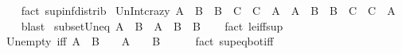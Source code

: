 \begin{isabellebody}
%
\isadelimproof
\ \ %
\endisadelimproof
%
\isatagproof
{}\isamarkupfalse%
\ {\isacharparenleft}{\kern0pt}fact\ sup{\isacharunderscore}{\kern0pt}inf{\isacharunderscore}{\kern0pt}distrib{}{\isacharparenright}{\kern0pt}%
\endisatagproof
{\isafoldproof}%
%
\isadelimproof
\isanewline
%
\endisadelimproof
\isanewline
{}\isamarkupfalse%
\ Un{\isacharunderscore}{\kern0pt}Int{\isacharunderscore}{\kern0pt}crazy{\isacharcolon}{\kern0pt}\ {\isachardoublequoteopen}{\isacharparenleft}{\kern0pt}A\ {\isasyminter}\ B{\isacharparenright}{\kern0pt}\ {\isasymunion}\ {\isacharparenleft}{\kern0pt}B\ {\isasyminter}\ C{\isacharparenright}{\kern0pt}\ {\isasymunion}\ {\isacharparenleft}{\kern0pt}C\ {\isasyminter}\ A{\isacharparenright}{\kern0pt}\ {\isacharequal}{\kern0pt}\ {\isacharparenleft}{\kern0pt}A\ {\isasymunion}\ B{\isacharparenright}{\kern0pt}\ {\isasyminter}\ {\isacharparenleft}{\kern0pt}B\ {\isasymunion}\ C{\isacharparenright}{\kern0pt}\ {\isasyminter}\ {\isacharparenleft}{\kern0pt}C\ {\isasymunion}\ A{\isacharparenright}{\kern0pt}{\isachardoublequoteclose}\isanewline
%
\isadelimproof
\ \ %
\endisadelimproof
%
\isatagproof
{}\isamarkupfalse%
\ blast%
\endisatagproof
{\isafoldproof}%
%
\isadelimproof
\isanewline
%
\endisadelimproof
\isanewline
{}\isamarkupfalse%
\ subset{\isacharunderscore}{\kern0pt}Un{\isacharunderscore}{\kern0pt}eq{\isacharcolon}{\kern0pt}\ {\isachardoublequoteopen}A\ {\isasymsubseteq}\ B\ {\isasymlongleftrightarrow}\ A\ {\isasymunion}\ B\ {\isacharequal}{\kern0pt}\ B{\isachardoublequoteclose}\isanewline
%
\isadelimproof
\ \ %
\endisadelimproof
%
\isatagproof
{}\isamarkupfalse%
\ {\isacharparenleft}{\kern0pt}fact\ le{\isacharunderscore}{\kern0pt}iff{\isacharunderscore}{\kern0pt}sup{\isacharparenright}{\kern0pt}%
\endisatagproof
{\isafoldproof}%
%
\isadelimproof
\isanewline
%
\endisadelimproof
\isanewline
{}\isamarkupfalse%
\ Un{\isacharunderscore}{\kern0pt}empty\ {\isacharbrackleft}{\kern0pt}iff{\isacharbrackright}{\kern0pt}{\isacharcolon}{\kern0pt}\ {\isachardoublequoteopen}A\ {\isasymunion}\ B\ {\isacharequal}{\kern0pt}\ {\isacharbraceleft}{\kern0pt}{\isacharbraceright}{\kern0pt}\ {\isasymlongleftrightarrow}\ A\ {\isacharequal}{\kern0pt}\ {\isacharbraceleft}{\kern0pt}{\isacharbraceright}{\kern0pt}\ {\isasymand}\ B\ {\isacharequal}{\kern0pt}\ {\isacharbraceleft}{\kern0pt}{\isacharbraceright}{\kern0pt}{\isachardoublequoteclose}\isanewline
%
\isadelimproof
\ \ %
\endisadelimproof
%
\isatagproof
{}\isamarkupfalse%
\ {\isacharparenleft}{\kern0pt}fact\ sup{\isacharunderscore}{\kern0pt}eq{\isacharunderscore}{\kern0pt}bot{\isacharunderscore}{\kern0pt}iff{\isacharparenright}{\kern0pt}%

\end{isabellebody}
